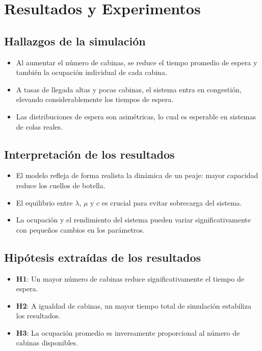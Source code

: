\documentclass[12pt]{article}
\begin{document}
\section{Resultados y Experimentos}

\subsection*{Hallazgos de la simulación}
\begin{itemize}
    \item Al aumentar el número de cabinas, se reduce el tiempo promedio de espera y también la ocupación individual de cada cabina.
    \item A tasas de llegada altas y pocas cabinas, el sistema entra en congestión, elevando considerablemente los tiempos de espera.
    \item Las distribuciones de espera son asimétricas, lo cual es esperable en sistemas de colas reales.
\end{itemize}

\subsection*{Interpretación de los resultados}
\begin{itemize}
    \item El modelo refleja de forma realista la dinámica de un peaje: mayor capacidad reduce los cuellos de botella.
    \item El equilibrio entre $\lambda$, $\mu$ y $c$ es crucial para evitar sobrecarga del sistema.
    \item La ocupación y el rendimiento del sistema pueden variar significativamente con pequeños cambios en los parámetros.
\end{itemize}

\subsection*{Hipótesis extraídas de los resultados}
\begin{itemize}
    \item \textbf{H1}: Un mayor número de cabinas reduce significativamente el tiempo de espera.
    \item \textbf{H2}: A igualdad de cabinas, un mayor tiempo total de simulación estabiliza los resultados.
    \item \textbf{H3}: La ocupación promedio es inversamente proporcional al número de cabinas disponibles.
\end{itemize}
\end{document}
